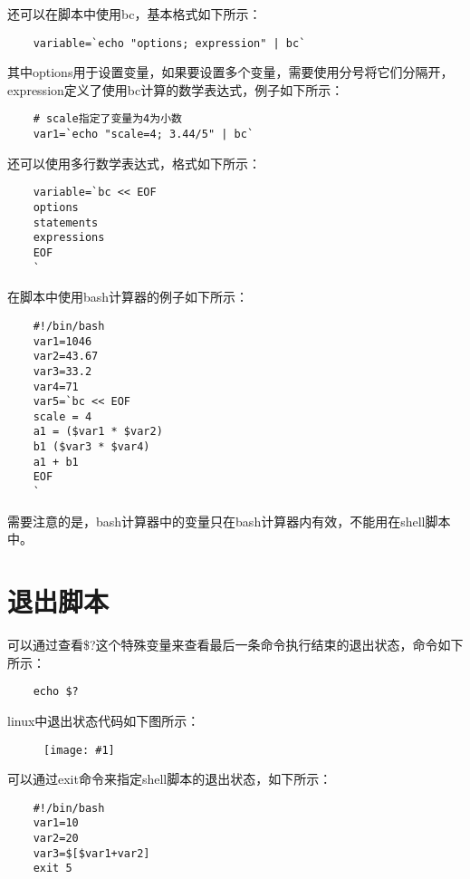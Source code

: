 \documentclass[a4paper,left=2.5cm,right=2.5cm,11pt]{article}
\newcommand{\fic}[1]{\begin{figure}[H]
		\center
		\texttt{[image: \#1]}
	\end{figure}}
\begin{document}
	还可以在脚本中使用bc，基本格式如下所示：
	\begin{lstlisting}
	variable=`echo "options; expression" | bc`
	\end{lstlisting}

	其中options用于设置变量，如果要设置多个变量，需要使用分号将它们分隔开，expression定义了使用bc计算的数学表达式，例子如下所示：
	\begin{lstlisting}
	# scale指定了变量为4为小数
	var1=`echo "scale=4; 3.44/5" | bc`
	\end{lstlisting}

	还可以使用多行数学表达式，格式如下所示：
	\begin{lstlisting}
	variable=`bc << EOF
	options
	statements
	expressions
	EOF
	`
	\end{lstlisting}

	在脚本中使用bash计算器的例子如下所示：
	\begin{lstlisting}
	#!/bin/bash
	var1=1046
	var2=43.67
	var3=33.2
	var4=71
	var5=`bc << EOF
	scale = 4
	a1 = ($var1 * $var2)
	b1 ($var3 * $var4)
	a1 + b1
	EOF
	`
	\end{lstlisting}

	需要注意的是，bash计算器中的变量只在bash计算器内有效，不能用在shell脚本中。

\section{退出脚本}
	可以通过查看\$?这个特殊变量来查看最后一条命令执行结束的退出状态，命令如下所示：
	\begin{lstlisting}
	echo $?
	\end{lstlisting}

	linux中退出状态代码如下图所示：
	\fic{5.png}

	可以通过exit命令来指定shell脚本的退出状态，如下所示：
	\begin{lstlisting}
	#!/bin/bash
	var1=10
	var2=20
	var3=$[$var1+var2]
	exit 5
	\end{lstlisting}
\end{document}
